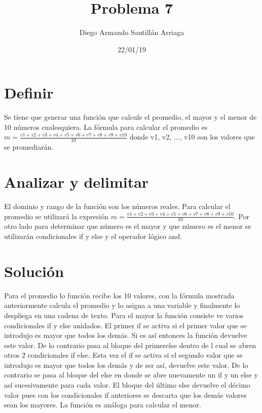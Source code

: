 \documentclass[letterpaper, 12pt, oneside]{article}%
\title{\Huge Problema 7}
\author{Diego Armando Santillán Arriaga}
\date{22/01/19}
\begin{document}
\maketitle
\newpage
\section*{Definir}
Se tiene que generar una función que calcule el promedio, el mayor y el menor de 10 números cualesquiera. La fórmula para calcular el promedio es $ m = \frac{v1+v2+v3+v4+v5+v6+v7+v8+v9+v10}{10} $ donde v1, v2, ..., v10 son los valores que se promediarán. \section*{Analizar y delimitar}
El dominio y rango de la función son los números reales. Para calcular el promedio se utilizará la expresión $ m = \frac{v1+v2+v3+v4+v5+v6+v7+v8+v9+v10}{10} $. Por otro lado para determinar que número es el mayor y que número es el menor se utilizarán condicionales if y else y el operador lógico and. 
\section*{Solución}
Para el promedio lo función recibe los 10 valores, con la fórmula mostrada anteriormente calcula el promedio y lo asigna a una variable y finalmente lo despliega en una cadena de texto. 
Para el mayor la función consiste ve varios condicionales if y else anidados. El primer if se activa si el primer valor que se introdujo es mayor que todos los demás. Si es así entonces la función devuelve este valor. De lo contrario pasa al bloque del primerelse dentro de l cual se abren otros 2 condicionales if else. Esta vez el if se activa si el segundo valor que se introdujo es mayor que todos los demás y de ser así, devuelve este valor. De lo contrario se pasa al bloque del else en donde se abre nuevamente un if y un else y así sucesivamente para cada valor. El bloque del último else devuelve el décimo valor pues con los condicionales if anteriores se descarta que los demás valores sean los mayores. 
La función es análoga para calcular el menor. 
\end{document}
